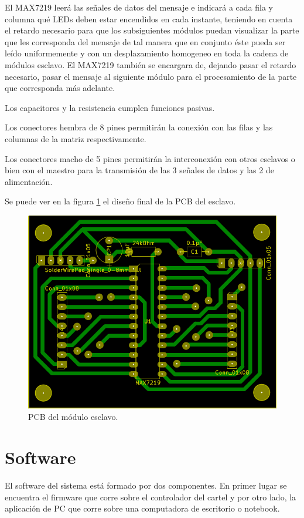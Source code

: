 El MAX7219 leerá las señales de datos del mensaje e indicará a cada fila y columna qué LEDs deben estar encendidos en cada instante, teniendo en cuenta el retardo necesario para que los subsiguientes módulos puedan visualizar la parte que les corresponda del mensaje de tal manera que en conjunto éste pueda ser leído uniformemente y con un desplazamiento homogeneo en toda la cadena de módulos esclavo. El MAX7219 también se encargara de, dejando pasar el retardo necesario, pasar el mensaje al siguiente módulo para el procesamiento de la parte que corresponda más adelante.

Los capacitores y la resistencia cumplen funciones pasivas.

Los conectores hembra de 8 pines permitirán la conexión con las filas y las columnas de la matriz respectivamente.

Los conectores macho de 5 pines permitirán la interconexión con otros esclavos o bien con el maestro para la transmisión de las 3 señales de datos y las 2 de alimentación.

Se puede ver en la figura \ref{fig:pcb-slave} el diseño final de la PCB del esclavo.

\begin{figure}[ht!]
	\centering
	\includegraphics[width=\linewidth]{imagenes/pcb-slave.pdf}
	\caption{PCB del módulo esclavo.}
	\label{fig:pcb-slave}
\end{figure}

\clearpage
\section{Software}\label{sec:sw}
El software del sistema está formado por dos componentes. En primer lugar se encuentra el firmware que corre sobre el controlador del cartel y por otro lado, la aplicación de PC que corre sobre una computadora de escritorio o notebook.

